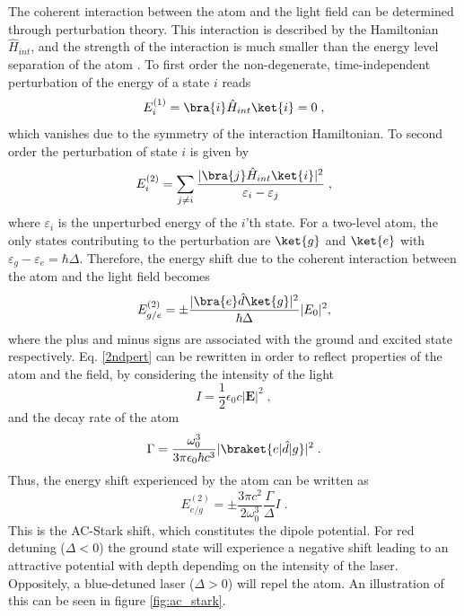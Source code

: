 The coherent interaction between the atom and the light field can be determined through perturbation theory. This interaction is described by the Hamiltonian $\hat{H}_{int}$, and the strength of the interaction is much smaller than the energy level separation of the atom \cite{grimm}.
To first order the non-degenerate, time-independent perturbation of the energy of a state $i$ reads
\begin{equation}
	E_{i}^{(1)} = \bra{i} \hat{H}_{int} \ket{i} = 0\; ,
\end{equation}
which vanishes due to the symmetry of the interaction Hamiltonian.
To second order the perturbation of state $i$ is given by
\begin{equation}
	E_i^{(2)} = \sum_{j \neq i} \frac{ |\bra{j} \hat{H}_{int}\ket{i}|^2}{\varepsilon_i - \varepsilon_j} \; ,
\end{equation}
where $\varepsilon_i$ is the unperturbed energy of the $i$'th state. For a two-level atom, the only states contributing to the perturbation are $\ket{g}$ and $\ket{e}$ with $\varepsilon_g - \varepsilon_e = \hbar \Delta $. Therefore, the energy shift due to the coherent interaction between the atom and the light field becomes
\begin{equation}
	E_{g/e}^{(2)}= \pm  \frac{ |\bra{e}\hat{d}\ket{g}|^2}{\hbar \Delta} |E_0|^2,
	\label{2ndpert}
\end{equation}
where the plus and minus signs are associated with the ground and excited state respectively. Eq. \eqref{2ndpert} can be rewritten in order to reflect properties of the atom and the field, by considering the intensity of the light
\begin{equation}
	I = \frac{1}{2} \epsilon_0 c |\boldsymbol{E}|^2 \; ,
\end{equation}
and the decay rate of the atom \cite{grimm}
\begin{equation}
	\Gamma = \frac{\omega_{0}^3}{3 \pi \epsilon_0 \hbar c^3} |\braket{e | \hat{d} | g}|^2 \; .
\end{equation}
Thus, the energy shift experienced by the atom can be written as  
\begin{equation}
	E_{e/g}^{(2)}=\pm \frac{3 \pi c^2}{2 \omega_{0}^3} \frac{\Gamma}{\Delta}I \; .
	\label{eq:dipolepot}
\end{equation}
This is the AC-Stark shift, which constitutes the dipole potential. For red detuning ($\Delta < 0$) the ground state will experience a negative shift leading to an attractive potential with depth depending on the intensity of the laser. Oppositely, a blue-detuned laser ($\Delta > 0$) will repel the atom. An illustration of this can be seen in figure \ref{fig:ac_stark}.
